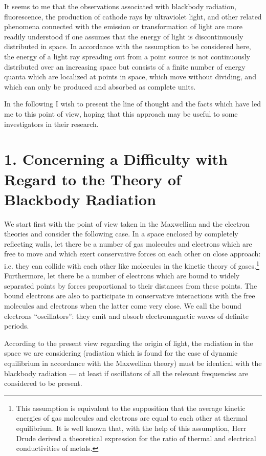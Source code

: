 \documentclass[12pt]{article}
\begin{document}
It seems to me that the observations associated with blackbody radiation,
fluorescence, the production of cathode rays by ultraviolet light, and other
related phenomena connected with the emission or transformation of light are
more readily understood if one assumes that the energy of light is
discontinuously distributed in space. In accordance with the assumption to be
considered here, the energy of a light ray spreading out from a point source is
not continuously distributed over an increasing space but consists of a finite
number of energy quanta which are localized at points in space, which move
without dividing, and which can only be produced and absorbed as complete units.

In the following I wish to present the line of thought and the facts which have
led me to this point of view, hoping that this approach may be useful to some
investigators in their research.

\vspace{0.5cm}
\section*{{\bf 1. Concerning a Difficulty with Regard to the Theory of Blackbody Radiation}}
\vspace{0.5cm}

We start first with the point of view taken in the Maxwellian and the electron
theories and consider the following case. In a space enclosed by completely
reflecting walls, let there be a number of gas molecules and electrons which are
free to move and which exert conservative forces on each other on close
approach: i.e. they can collide with each other like molecules in the kinetic
theory of gases.\footnote{This assumption is equivalent to the supposition that
the average kinetic energies of gas molecules and electrons are equal to each
other at thermal equilibrium. It is well known that, with the help of this
assumption, Herr Drude derived a theoretical expression for the ratio of thermal
and electrical conductivities of metals.} Furthermore, let there be a number of
electrons which are bound to widely separated points by forces proportional to
their distances from these points. The bound electrons are also to participate
in conservative interactions with the free molecules and electrons when the
latter come very close. We call the bound electrons ``oscillators'': they emit
and absorb electromagnetic waves of definite periods.

According  to the  present  view  regarding the  origin of  light, the
radiation in the  space we are  considering  (radiation which is found
for the case of dynamic  equilibrium in accordance with the Maxwellian
theory) must be identical with the  blackbody radiation --- 
at least if
oscillators  of all  the  relevant  frequencies  are  considered to be
present.
\end{document}
